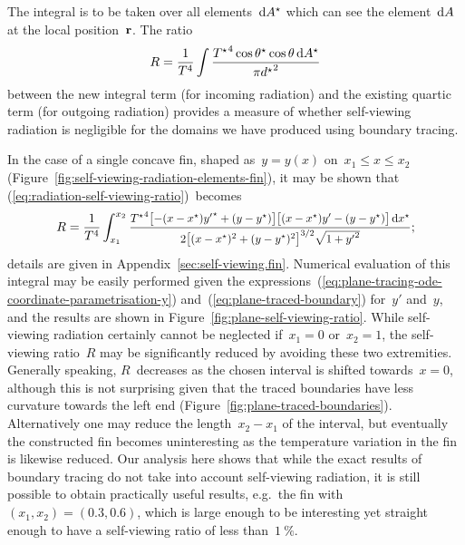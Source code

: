 The integral is to be taken over all elements~$\mathop{}\!\mathrm{d} A^\star$
which can see the element~$\mathop{}\!\mathrm{d} A$ at the local position~$\boldsymbol{\mathbf{r}}$.
The ratio
\begin{equation}
  \savecontent{
    R =
      \frac{1}{T^4}
      \int
        \frac{
          {T^\star}^4 \cos\theta^\star \cos\theta \td A^\star
        }{
          \pi {d^\star}^2
        }
  }{eq:radiation-self-viewing-ratio}
\end{equation}
between the new integral term (for incoming radiation)
and the existing quartic term (for outgoing radiation)
provides a measure of whether self-viewing radiation is negligible
for the domains we have produced using boundary tracing.

\begin{figure}
\end{figure}

In the case of a single concave fin,
shaped as~$y = y (x)$ on~$x_1 \le x \le x_2$
(Figure~\ref{fig:self-viewing-radiation-elements-fin}),
it may be shown that (\ref{eq:radiation-self-viewing-ratio})~becomes
\begin{equation}
  \savecontent{
    R =
      \frac{1}{T^4}
      \int_{x_1}^{x_2}
        \smallerfrac{
          {T^\star}^4
          \squarebr[\big]{-(x - x^\star) {y'}^\star + (y - y^\star)}
          \squarebr[\big]{(x - x^\star) y' - (y - y^\star)}
          \td x^\star
        }{
          2
          \squarebr[\big]{(x - x^\star)^2 + (y - y^\star)^2}^{3/2}
          \sqrt{1 + {y'}^2}
        }
  }{eq:plane-self-viewing-ratio};
\end{equation}
details are given in Appendix~\ref{sec:self-viewing.fin}.
Numerical evaluation of this integral may be easily performed
given the expressions~(\ref{eq:plane-tracing-ode-coordinate-parametrisation-y})
and~(\ref{eq:plane-traced-boundary}) for~$y'$ and~$y$,
and the results are shown in Figure~\ref{fig:plane-self-viewing-ratio}.
While self-viewing radiation certainly cannot be neglected
if~$x_1 = 0$ or~$x_2 = 1$,
the self-viewing ratio~$R$ may be significantly reduced
by avoiding these two extremities.
Generally speaking,
$R$~decreases as the chosen interval is shifted towards~$x = 0$,
although this is not surprising
given that the traced boundaries have less curvature
towards the left end (Figure~\ref{fig:plane-traced-boundaries}).
Alternatively one may reduce the length~$x_2 - x_1$ of the interval,
but eventually the constructed fin becomes uninteresting
as the temperature variation in the fin is likewise reduced.
Our analysis here shows that while the exact results of boundary tracing
do not take into account self-viewing radiation,
it is still possible to obtain practically useful results,
e.g.~the fin with~$(x_1, x_2) = (0.3, 0.6)$,
which is large enough to be interesting
yet straight enough to have a self-viewing ratio
of less than~$\SI{1}{\percent}$.

